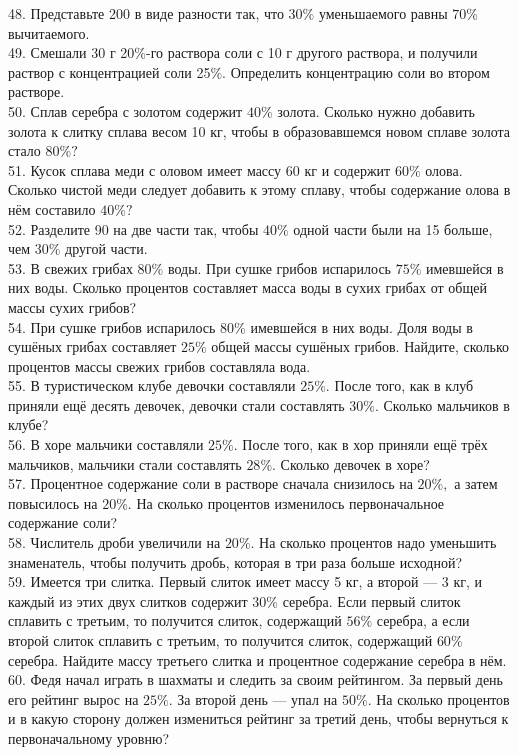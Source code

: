 48. Представьте 200 в виде разности так, что $30\%$ уменьшаемого равны $70\%$ вычитаемого.\\
49. Смешали 30 г 20$\%$-го раствора соли с 10 г другого раствора, и получили раствор с концентрацией соли 25$\%$. Определить концентрацию соли во втором растворе.\\
50. Сплав серебра с золотом содержит $40\%$ золота. Сколько нужно добавить золота к слитку сплава весом 10 кг, чтобы в образовавшемся новом сплаве золота стало $80\%?$\\
51. Кусок сплава меди с оловом имеет массу 60 кг и содержит $60\%$ олова. Сколько чистой меди следует добавить к этому сплаву, чтобы содержание олова в нём составило $40\%?$\\
52. Разделите 90 на две части так, чтобы $40\%$ одной части были на 15 больше, чем $30\%$ другой части.\\
53. В свежих грибах $80\%$ воды. При сушке грибов испарилось $75\%$ имевшейся в них воды. Сколько процентов составляет масса воды в сухих грибах от общей массы сухих грибов?\\
54. При сушке грибов испарилось $80\%$ имевшейся в них воды. Доля воды в сушёных грибах составляет $25\%$ общей массы сушёных грибов. Найдите, сколько процентов массы свежих грибов составляла вода.\\
55. В туристическом клубе девочки составляли $25\%.$ После того, как в клуб приняли ещё десять девочек, девочки стали составлять $30\%.$ Сколько мальчиков в клубе?\\
56. В хоре мальчики составляли $25\%.$ После того, как в хор приняли ещё трёх мальчиков, мальчики стали составлять $28\%.$ Сколько девочек в хоре?\\
57. Процентное содержание соли в растворе сначала снизилось на $20\%,$ а затем повысилось на $20\%.$ На сколько процентов изменилось первоначальное содержание соли?\\
58. Числитель дроби увеличили на $20\%.$ На сколько процентов надо уменьшить знаменатель, чтобы получить дробь, которая в три раза больше исходной?\\
59. Имеется три слитка. Первый слиток имеет массу 5 кг, а второй --- 3 кг, и каждый из этих двух слитков содержит $30\%$ серебра. Если первый слиток сплавить с третьим, то получится слиток, содержащий $56\%$ серебра, а если второй слиток сплавить с третьим, то получится слиток, содержащий $60\%$ серебра. Найдите массу третьего слитка и процентное содержание серебра в нём.\\
60. Федя начал играть в шахматы и следить за своим рейтингом. За первый день его рейтинг вырос на $25\%.$ За второй день --- упал на $50\%.$ На сколько процентов и в какую сторону должен измениться рейтинг за третий день, чтобы вернуться к первоначальному уровню?\\
